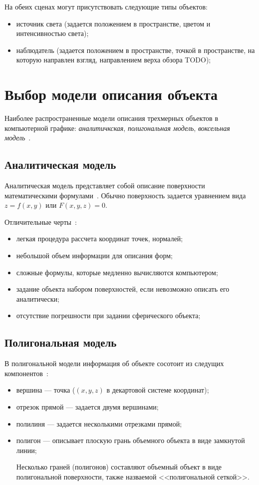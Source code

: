 На обеих сценах могут присутствовать следующие типы объектов:
\begin{itemize}
    \item источник света (задается положением в пространстве, цветом и интенсивностью света);
    \item наблюдатель (задается положением в пространстве, точкой в пространстве, на которую направлен взгляд, направлением верха обзора TODO);
\end{itemize}


\section{Выбор модели описания объекта}
Наиболее распространенные модели описания трехмерных объектов в компьютерной графике: \textit{аналитичкская}, \textit{полигональная модель}, \textit{воксельная модель}~\cite{porev}.

\subsection{Аналитическая модель}
Аналитическая модель представляет собой описание поверхности математическими формулами~\cite{porev}. Обычно поверхность задается уравнением вида $z=f(x,y)$ или $F(x,y,z)=0$.

Отличительные черты~\cite{porev}:
\begin{itemize}
    \item легкая процедура рассчета координат точек, нормалей;
    \item небольшой объем информации для описания форм;
    \item сложные формулы, которые медленно вычисляются компьютером;

    \item задание объекта набором поверхностей, если невозможно описать его аналитически;
    \item отсутствие погрешности при задании сферического объекта;
\end{itemize}

\subsection{Полигональная модель}
В полигональной модели информация об объекте сосотоит из следущих компонентов~\cite{porev}:
\begin{itemize}
    \item вершина --- точка ($(x, y, z)$ в декартовой системе координат);
    \item отрезок прямой --- задается двумя вершинами;
    \item полилиня --- задается несколькими отрезками прямой;
    \item полигон --- описывает плоскую грань объемного объекта в виде замкнутой линии;

    Несколько граней (полигонов) составляют объемный объект в виде полигональной поверхности, также назваемой <<полигональной сеткой>>.
\end{itemize}

